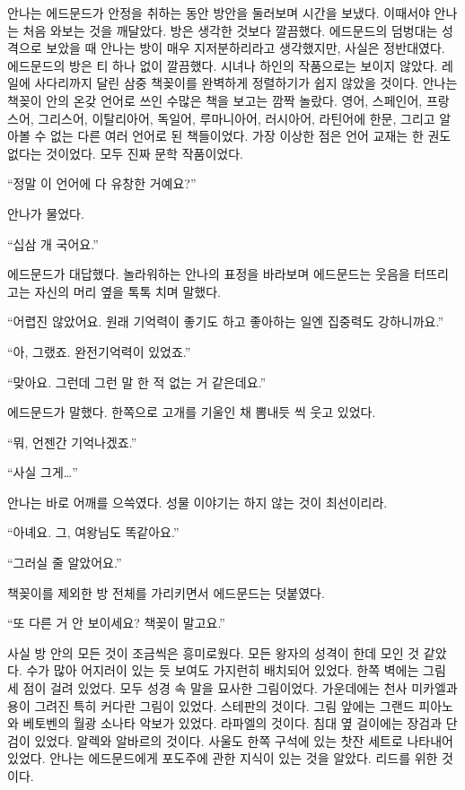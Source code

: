 안나는 에드문드가 안정을 취하는 동안 방안을 둘러보며 시간을 보냈다. 이때서야 안나는 처음 와보는 것을 깨달았다. 방은 생각한 것보다 깔끔했다. 에드문드의 덤벙대는 성격으로 보았을 때 안나는 방이 매우 지저분하리라고 생각했지만, 사실은 정반대였다. 에드문드의 방은 티 하나 없이 깔끔했다. 시녀나 하인의 작품으로는 보이지 않았다. 레일에 사다리까지 달린 삼중 책꽂이를 완벽하게 정렬하기가 쉽지 않았을 것이다. 안나는 책꽂이 안의 온갖 언어로 쓰인 수많은 책을 보고는 깜짝 놀랐다. 영어, 스페인어, 프랑스어, 그리스어, 이탈리아어, 독일어, 루마니아어, 러시아어, 라틴어에 한문, 그리고 알아볼 수 없는 다른 여러 언어로 된 책들이었다. 가장 이상한 점은 언어 교재는 한 권도 없다는 것이었다. 모두 진짜 문학 작품이었다.

``정말 이 언어에 다 유창한 거예요?''

안나가 물었다.

``십삼 개 국어요.''

에드문드가 대답했다. 놀라워하는 안나의 표정을 바라보며 에드문드는 웃음을 터뜨리고는 자신의 머리 옆을 톡톡 치며 말했다.

``어렵진 않았어요. 원래 기억력이 좋기도 하고 좋아하는 일엔 집중력도 강하니까요.''

``아, 그랬죠. 완전기억력이 있었죠.''

``맞아요. 그런데 그런 말 한 적 없는 거 같은데요.''

에드문드가 말했다. 한쪽으로 고개를 기울인 채 뽐내듯 씩 웃고 있었다.

``뭐, 언젠간 기억나겠죠.''

``사실 그게\ldots''

안나는 바로 어깨를 으쓱였다. 성물 이야기는 하지 않는 것이 최선이리라.

``아녜요. 그, 여왕님도 똑같아요.''

``그러실 줄 알았어요.''

책꽂이를 제외한 방 전체를 가리키면서 에드문드는 덧붙였다.

``또 다른 거 안 보이세요? 책꽂이 말고요.''

사실 방 안의 모든 것이 조금씩은 흥미로웠다. 모든 왕자의 성격이 한데 모인 것 같았다. 수가 많아 어지러이 있는 듯 보여도 가지런히 배치되어 있었다. 한쪽 벽에는 그림 세 점이 걸려 있었다. 모두 성경 속 말을 묘사한 그림이었다. 가운데에는 천사 미카엘과 용이 그려진 특히 커다란 그림이 있었다. 스테판의 것이다. 그림 앞에는 그랜드 피아노와 베토벤의 월광 소나타 악보가 있었다. 라파엘의 것이다. 침대 옆 걸이에는 장검과 단검이 있었다. 알렉와 알바르의 것이다. 사울도 한쪽 구석에 있는 찻잔 세트로 나타내어 있었다. 안나는 에드문드에게 포도주에 관한 지식이 있는 것을 알았다. 리드를 위한 것이다.

